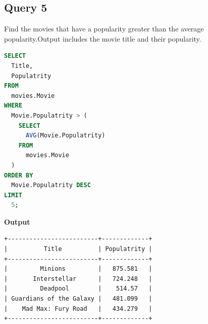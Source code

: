 \documentclass{article}
\begin{document}
\pagebreak

\subsection{Query 5}
Find the movies that have a popularity greater than the average popularity.Output includes the movie title and their popularity.
\begin{lstlisting}[language=SQL]
SELECT 
  Title, 
  Populatrity 
FROM 
  movies.Movie 
WHERE 
  Movie.Populatrity > (
    SELECT 
      AVG(Movie.Populatrity) 
    FROM 
      movies.Movie
  ) 
ORDER BY 
  Movie.Populatrity DESC 
LIMIT 
  5;

\end{lstlisting}

\textbf{Output}
\begin{lstlisting}
+-------------------------+-------------+
|          Title          | Populatrity |
+-------------------------+-------------+
|         Minions         |   875.581   |
|       Interstellar      |   724.248   |
|         Deadpool        |    514.57   |
| Guardians of the Galaxy |   481.099   |
|    Mad Max: Fury Road   |   434.279   |
+-------------------------+-------------+

\end{lstlisting}
\end{document}
